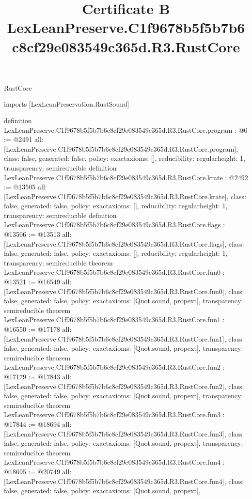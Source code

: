 \begin{lexlean}{RustCore}
\title{Certificate B LexLeanPreserve.C1f9678b5f5b7b6c8cf29e083549c365d.R3.RustCore}
\begin{coremodule}
imports [LexLeanPreservation.RustSound]

definition LexLeanPreserve.C1f9678b5f5b7b6c8cf29e083549c365d.R3.RustCore.program : @0 := @2491 {
  all: [LexLeanPreserve.C1f9678b5f5b7b6c8cf29e083549c365d.R3.RustCore.program],
  class: false,
  generated: false,
  policy: exact{axioms: []},
  reducibility: regular{height: 1},
  transparency: semireducible
}
definition LexLeanPreserve.C1f9678b5f5b7b6c8cf29e083549c365d.R3.RustCore.krate : @2492 := @13505 {
  all: [LexLeanPreserve.C1f9678b5f5b7b6c8cf29e083549c365d.R3.RustCore.krate],
  class: false,
  generated: false,
  policy: exact{axioms: []},
  reducibility: regular{height: 1},
  transparency: semireducible
}
definition LexLeanPreserve.C1f9678b5f5b7b6c8cf29e083549c365d.R3.RustCore.flags : @13506 := @13513 {
  all: [LexLeanPreserve.C1f9678b5f5b7b6c8cf29e083549c365d.R3.RustCore.flags],
  class: false,
  generated: false,
  policy: exact{axioms: []},
  reducibility: regular{height: 1},
  transparency: semireducible
}
theorem LexLeanPreserve.C1f9678b5f5b7b6c8cf29e083549c365d.R3.RustCore.fun0 : @13521 := @16549 {
  all: [LexLeanPreserve.C1f9678b5f5b7b6c8cf29e083549c365d.R3.RustCore.fun0],
  class: false,
  generated: false,
  policy: exact{axioms: [Quot.sound, propext]},
  transparency: semireducible
}
theorem LexLeanPreserve.C1f9678b5f5b7b6c8cf29e083549c365d.R3.RustCore.fun1 : @16550 := @17178 {
  all: [LexLeanPreserve.C1f9678b5f5b7b6c8cf29e083549c365d.R3.RustCore.fun1],
  class: false,
  generated: false,
  policy: exact{axioms: [Quot.sound, propext]},
  transparency: semireducible
}
theorem LexLeanPreserve.C1f9678b5f5b7b6c8cf29e083549c365d.R3.RustCore.fun2 : @17179 := @17843 {
  all: [LexLeanPreserve.C1f9678b5f5b7b6c8cf29e083549c365d.R3.RustCore.fun2],
  class: false,
  generated: false,
  policy: exact{axioms: [Quot.sound, propext]},
  transparency: semireducible
}
theorem LexLeanPreserve.C1f9678b5f5b7b6c8cf29e083549c365d.R3.RustCore.fun3 : @17844 := @18694 {
  all: [LexLeanPreserve.C1f9678b5f5b7b6c8cf29e083549c365d.R3.RustCore.fun3],
  class: false,
  generated: false,
  policy: exact{axioms: [Quot.sound, propext]},
  transparency: semireducible
}
theorem LexLeanPreserve.C1f9678b5f5b7b6c8cf29e083549c365d.R3.RustCore.fun4 : @18695 := @20749 {
  all: [LexLeanPreserve.C1f9678b5f5b7b6c8cf29e083549c365d.R3.RustCore.fun4],
  class: false,
  generated: false,
  policy: exact{axioms: [Quot.sound, propext]},
}
\end{coremodule}
\end{lexlean}
